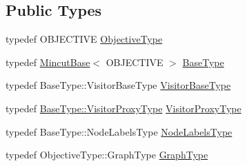 \subsection*{Public Types}
\begin{DoxyCompactItemize}
\item 
typedef O\+B\+J\+E\+C\+T\+I\+VE \hyperlink{classnifty_1_1graph_1_1opt_1_1mincut_1_1MincutQpbo_ac598cbbe660ac111ee5af88095d4b6e7}{Objective\+Type}
\item 
typedef \hyperlink{classnifty_1_1graph_1_1opt_1_1mincut_1_1MincutBase}{Mincut\+Base}$<$ O\+B\+J\+E\+C\+T\+I\+VE $>$ \hyperlink{classnifty_1_1graph_1_1opt_1_1mincut_1_1MincutQpbo_a8f71e6bc2cd81bc7ccaa80b78d492ecb}{Base\+Type}
\item 
typedef Base\+Type\+::\+Visitor\+Base\+Type \hyperlink{classnifty_1_1graph_1_1opt_1_1mincut_1_1MincutQpbo_a1233aed5d95f3549018cabfb2f5c51c3}{Visitor\+Base\+Type}
\item 
typedef \hyperlink{classnifty_1_1graph_1_1opt_1_1common_1_1SolverBase_ad209b469b3bc9fc0fc14e9fed4d09075}{Base\+Type\+::\+Visitor\+Proxy\+Type} \hyperlink{classnifty_1_1graph_1_1opt_1_1mincut_1_1MincutQpbo_a66f72c74bd6db213eedc34a6736ac9a8}{Visitor\+Proxy\+Type}
\item 
typedef Base\+Type\+::\+Node\+Labels\+Type \hyperlink{classnifty_1_1graph_1_1opt_1_1mincut_1_1MincutQpbo_ac4034e26807b6dd2ec740c8716f89ad8}{Node\+Labels\+Type}
\item 
typedef Objective\+Type\+::\+Graph\+Type \hyperlink{classnifty_1_1graph_1_1opt_1_1mincut_1_1MincutQpbo_a695840218c3b4e342c798aba785c302b}{Graph\+Type}
\end{DoxyCompactItemize}
